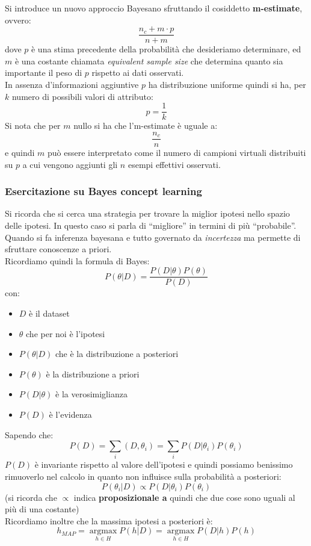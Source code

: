 Si introduce un nuovo approccio Bayesano sfruttando il cosiddetto
\textbf{m-estimate}, ovvero: 
\[\frac{n_c+m\cdot p}{n+m}\]
dove $p$ è una stima precedente della probabilità che desideriamo determinare,
ed $m$ è una costante chiamata \textit{equivalent sample size} che determina
quanto sia importante il peso di $p$ rispetto ai dati osservati.\\
In assenza d'informazioni aggiuntive $p$ ha distribuzione uniforme quindi si
ha, per $k$ numero di possibili valori di attributo:
\[p=\frac{1}{k}\]
Si nota che per $m$ nullo si ha che l'm-estimate è uguale a:
\[\frac{n_c}{n}\]
e quindi $m$ può essere interpretato come il numero di campioni virtuali
distribuiti su $p$ a cui vengono aggiunti gli $n$ esempi effettivi osservati.
\subsubsection{Esercitazione su Bayes concept learning}
Si ricorda che si cerca una strategia per trovare la miglior ipotesi nello
spazio delle ipotesi. In questo caso si parla di ``migliore'' in termini di più
``probabile''. \\
Quando si fa inferenza bayesana e tutto governato da \textit{incertezza} ma
permette di sfruttare conoscenze a priori.\\
Ricordiamo quindi la formula di Bayes:
\[P(\theta|D)=\frac{P(D|\theta)P(\theta)}{P(D)}\]
con:
\begin{itemize}
  \item $D$ è il dataset
  \item $\theta$ che per noi è l'ipotesi
  \item $P(\theta|D)$ che è la distribuzione a posteriori
  \item $P(\theta)$ è la distribuzione a priori
  \item $P(D|\theta)$ è la verosimiglianza
  \item $P(D)$ è l'evidenza
\end{itemize}
Sapendo che:
\[P(D)=\sum_i(D, \theta_i)=\sum_i P(D|\theta_i)P(\theta_i)\]
$P(D)$ è invariante rispetto al valore dell'ipotesi e quindi possiamo benissimo
rimuoverlo nel calcolo in quanto non influisce sulla probabilità a posteriori:
\[P(\theta_i|D)\varpropto P(D|\theta_i)P(\theta_i)\]
(si ricorda che $\varpropto$ indica \textbf{proposizionale a} quindi che due
cose sono uguali al più di una costante)\\
Ricordiamo inoltre che la massima ipotesi a posteriori è:
\[h_{MAP}=\operatorname*{argmax}_{h\in H}P(h|D)=
  \operatorname*{argmax}_{h\in H}P(D|h)P(h)\]
